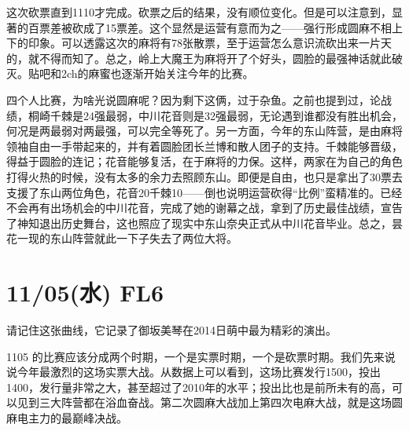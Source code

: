 这次砍票直到1110才完成。砍票之后的结果，没有顺位变化。但是可以注意到，显著的百票差被砍成了15票差。这个显然是运营有意而为之——强行形成圆麻不相上下的印象。可以透露这次的麻将有78张散票，至于运营怎么意识流砍出来一片天的，就不得而知了。总之，岭上大魔王为麻将开了个好头，圆脸的最强神话就此破灭。贴吧和2ch的麻蜜也逐渐开始关注今年的比赛。

四个人比赛，为啥光说圆麻呢？因为剩下这俩，过于杂鱼。之前也提到过，论战绩，桐崎千棘是24强最弱，中川花音则是32强最弱，无论遇到谁都没有胜出机会，何况是两最弱对两最强，可以完全等死了。另一方面，今年的东山阵营，是由麻将领袖自由一手带起来的，并有着圆脸团长兰博和散人团子的支持。千棘能够晋级，得益于圆脸的连记；花音能够复活，在于麻将的力保。这样，两家在为自己的角色打得火热的时候，没有太多的余力去照顾东山。即便是自由，也只是拿出了30票去支援了东山两位角色，花音20千棘10——倒也说明运营砍得“比例”蛮精准的。已经不会再有出场机会的中川花音，完成了她的谢幕之战，拿到了历史最佳战绩，宣告了神知退出历史舞台，这也照应了现实中东山奈央正式从中川花音毕业。总之，昙花一现的东山阵营就此一下子失去了两位大将。

\section{11/05(水) FL6}



请记住这张曲线，它记录了御坂美琴在2014日萌中最为精彩的演出。

1105 的比赛应该分成两个时期，一个是实票时期，一个是砍票时期。我们先来说说今年最激烈的这场实票大战。从数据上可以看到，这场比赛发行1500，投出1400，发行量非常之大，甚至超过了2010年的水平；投出比也是前所未有的高，可以见到三大阵营都在浴血奋战。第二次圆麻大战加上第四次电麻大战，就是这场圆麻电主力的最巅峰决战。

